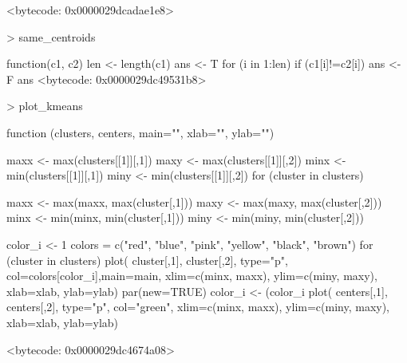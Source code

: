 \documentclass [a4paper] {article}
\begin{document}
\begin{Schunk}
\begin{Soutput}
{}
<bytecode: 0x0000029dcadae1e8>
\end{Soutput}
\begin{Sinput}
> same_centroids
\end{Sinput}
\begin{Soutput}
function(c1, c2){
  len <- length(c1)
  ans <- T
  for (i in 1:len){
    if (c1[i]!=c2[i]){
      ans <- F
    }
  }
  ans
}
<bytecode: 0x0000029dc49531b8>
\end{Soutput}
\begin{Sinput}
> plot_kmeans
\end{Sinput}
\begin{Soutput}
function (clusters, centers, main="", xlab="", ylab="") {
  maxx <- max(clusters[[1]][,1])
  maxy <- max(clusters[[1]][,2])
  minx <- min(clusters[[1]][,1])
  miny <- min(clusters[[1]][,2])
  for (cluster in clusters){
    maxx <- max(maxx, max(cluster[,1]))
    maxy <- max(maxy, max(cluster[,2]))
    minx <- min(minx, min(cluster[,1]))
    miny <- min(miny, min(cluster[,2]))

  }
  color_i <- 1
  colors = c("red", "blue", "pink", "yellow", "black", "brown")
  for (cluster in clusters){
    plot( cluster[,1], cluster[,2], type="p", col=colors[color_i],main=main,
          xlim=c(minx, maxx), ylim=c(miny, maxy), xlab=xlab, ylab=ylab)
    par(new=TRUE)
    color_i <- (color_i%
  }
  plot( centers[,1], centers[,2], type="p", col="green",
        xlim=c(minx, maxx), ylim=c(miny, maxy), xlab=xlab, ylab=ylab)
}
<bytecode: 0x0000029dc4674a08>
\end{Soutput}
\end{Schunk}
\end{document}
